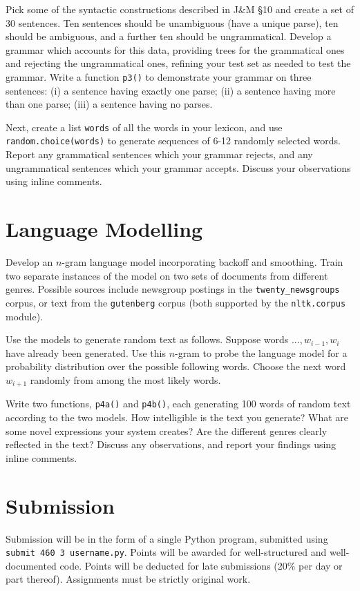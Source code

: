 \documentclass{460}
\begin{document}
Pick some of the syntactic constructions described in J\&M \S 10
and create a set of 30 sentences.  Ten sentences should be unambiguous (have
a unique parse), ten should be ambiguous, and a further ten should be
ungrammatical.  Develop a grammar which accounts for this data,
providing trees for the grammatical ones and rejecting the ungrammatical ones,
refining your test set as needed to test the grammar.  Write
a function \texttt{p3()} to demonstrate your grammar on three sentences:
(i) a sentence having exactly one parse;
(ii) a sentence having more than one parse;
(iii) a sentence having no parses.

Next, create a list \texttt{words} of all the words in your lexicon, and use
\texttt{random.choice(words)} to generate sequences of 6-12 randomly
selected words.  Report any grammatical sentences which your grammar
rejects, and any ungrammatical sentences which your grammar accepts.
Discuss your observations using inline comments.

\section{Language Modelling}

Develop an $n$-gram language model incorporating backoff and smoothing.
Train two separate instances of the model on two sets of documents from
different genres.  Possible sources include newsgroup postings in
the \texttt{twenty\_newsgroups} corpus, or text from the \texttt{gutenberg}
corpus (both supported by the \texttt{nltk.corpus} module).

Use the models to generate random text as follows.  Suppose words
$..., w_{i-1}, w_{i}$ have already been generated.  Use this $n$-gram
to probe the language model for a probability distribution over the
possible following words.  Choose the next word $w_{i+1}$ randomly from
among the most likely words.

Write two functions, \texttt{p4a()} and \texttt{p4b()}, each
generating 100 words of random text according to the two models.  How
intelligible is the text you generate?  What are some novel
expressions your system creates?  Are the different genres clearly
reflected in the text?  Discuss any observations, and report your
findings using inline comments.

\section*{Submission}

Submission will be in the form of a single Python program, submitted
using \texttt{submit 460 3 username.py}.  Points will be awarded for
well-structured and well-documented code.  Points will be deducted for
late submissions (20\% per day or part thereof).  Assignments must be
strictly original work.
\end{document}
